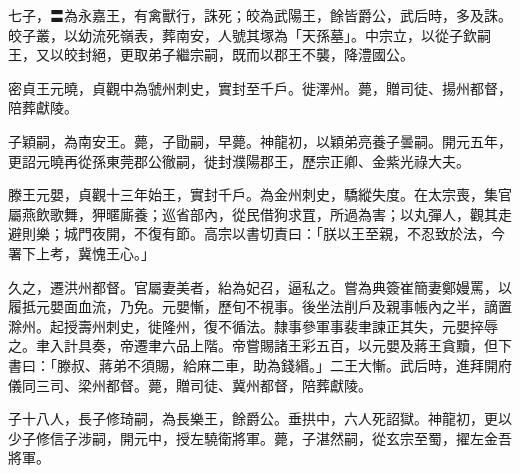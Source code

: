 \begin{pinyinscope}
 七子，〓為永嘉王，有禽獸行，誅死；皎為武陽王，餘皆爵公，武后時，多及誅。皎子叢，以幼流死嶺表，葬南安，人號其塚為「天孫墓」。中宗立，以從子欽嗣王，又以皎封絕，更取弟子繼宗嗣，既而以郡王不襲，降澧國公。



 密貞王元曉，貞觀中為虢州刺史，實封至千戶。徙澤州。薨，贈司徒、揚州都督，陪葬獻陵。



 子穎嗣，為南安王。薨，子勖嗣，早薨。神龍初，以穎弟亮養子曇嗣。開元五年，更詔元曉再從孫東莞郡公徹嗣，徙封濮陽郡王，歷宗正卿、金紫光祿大夫。



 滕王元嬰，貞觀十三年始王，實封千戶。為金州刺史，驕縱失度。在太宗喪，集官屬燕飲歌舞，狎暱廝養；巡省部內，從民借狗求罝，所過為害；以丸彈人，觀其走避則樂；城門夜開，不復有節。高宗以書切責曰：「朕以王至親，不忍致於法，今署下上考，冀愧王心。」



 久之，遷洪州都督。官屬妻美者，紿為妃召，逼私之。嘗為典簽崔簡妻鄭嫚罵，以履抵元嬰面血流，乃免。元嬰慚，歷旬不視事。後坐法削戶及親事帳內之半，謫置滁州。起授壽州刺史，徙隆州，復不循法。隸事參軍事裴聿諫正其失，元嬰捽辱之。聿入計具奏，帝遷聿六品上階。帝嘗賜諸王彩五百，以元嬰及蔣王貪黷，但下書曰：「滕叔、蔣弟不須賜，給麻二車，助為錢緡。」二王大慚。武后時，進拜開府儀同三司、梁州都督。薨，贈司徒、冀州都督，陪葬獻陵。



 子十八人，長子修琦嗣，為長樂王，餘爵公。垂拱中，六人死詔獄。神龍初，更以少子修信子涉嗣，開元中，授左驍衛將軍。薨，子湛然嗣，從玄宗至蜀，擢左金吾將軍。



\end{pinyinscope}